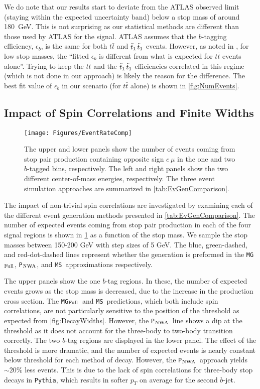 \documentclass[a4paper,12pt]{article}
\newcommand{\pythia}{\texttt{P}$_{\rm{NWA}}$}
\newcommand{\mg}{\texttt{MG}$_{\rm{Full}}$}
\newcommand{\ms}{\texttt{MS}}
\def\stopone{\ensuremath{\mathchoice%
      {\displaystyle\raise.0ex\hbox{$\displaystyle\tilde t_1$}}%
         {\textstyle\raise-.2ex\hbox{$\textstyle\tilde t_1$}}%
       {\scriptstyle\raise.0ex\hbox{$\scriptstyle\tilde t_1$}}%
 {\scriptscriptstyle\raise.0ex\hbox{$\scriptscriptstyle\tilde t_1$}}}}
\begin{document}
We do note that our results start to deviate from the ATLAS observed limit (staying within the expected uncertainty band) below a stop mass of around 180~GeV.  This is not surprising as our statistical methods are different than those used by ATLAS for the signal.  ATLAS assumes that the $b$-tagging efficiency, $\epsilon_b$, is the same for both $t\bar{t}$ and $\stopone \,\stopone$ events. However, as noted in \cite{SUSY-2014-07}, for low stop masses, the ``fitted $\epsilon_b$ is different from what is expected for $t\bar{t}$ events alone''. Trying to keep the $t\bar{t}$ and the $\stopone\,\stopone$ efficiencies correlated in this regime (which is not done in our approach) is likely the reason for the difference. The best fit value of $\epsilon_b$ in our scenario (for $t\bar{t}$ alone) is shown in \cref{fig:NumEvents}.

\subsection{Impact of Spin Correlations and Finite Widths}

\begin{figure}[t]
\begin{center}
\texttt{[image: Figures/EventRateComp]}
\caption{The upper and lower panels show the number of events coming from stop pair production containing opposite sign $e\,\mu$ in the one and two $b$-tagged bins, respectively. The left and right panels show the two different center-of-mass energies, respectively.  The three event simulation approaches are summarized in \cref{tab:EvGenComparison}. }
\label{fig:EMUB}
\end{center}
\end{figure}

The impact of non-trivial spin correlations are investigated by examining each of the different event generation methods presented in \cref{tab:EvGenComparison}. The number of expected events coming from stop pair production in each of the four signal regions is shown in \cref{fig:EMUB} as a function of the stop mass. We sample the stop masses between 150-200 GeV with step sizes of 5 GeV. The blue, green-dashed, and red-dot-dashed lines represent whether the generation is preformed in the \mg, \pythia, and \ms\ approximations respectively. 

The upper panels show the one $b$-tag regions. In these, the number of expected events grows as the stop mass is decreased, due to the increase in the production cross section. The \mg\ and \ms\ predictions, which both include spin correlations, are not particularly sensitive to the position of the threshold as expected from \cref{fig:DecayWidths}. However, the \pythia\ line shows a dip at the threshold as it does not account for the three-body to two-body transition correctly. The two $b$-tag regions are displayed in the lower panel. The effect of the threshold is more dramatic, and the number of expected events is nearly constant below threshold for each method of decay. However, the \pythia\ approach yields $\sim 20\%$ less events. This is due to the lack of spin correlations for three-body stop decays in \texttt{Pythia}, which results in softer $p_T$ on average for the second $b$-jet.
\end{document}
